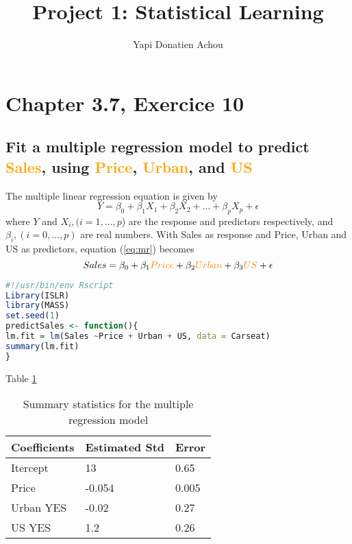 \documentclass[11pt, oneside]{article}   	%
\title{Project 1: Statistical Learning}
\author{Yapi Donatien Achou}
\begin{document}
\maketitle
\section{Chapter 3.7, Exercice 10}
\subsection{Fit a multiple regression model to predict \textcolor{orange}{Sales}, using \textcolor{orange}{Price}, \textcolor{orange}{Urban}, and \textcolor{orange}{US}}
The multiple linear regression equation is given by \cite{gareth}
\begin{equation}\label{eq:mr}
Y = \beta_{0} + \beta_{1}X_{1} + \beta_{2}X_{2}+ \dots + \beta_{p}X_{p} + \epsilon
\end{equation}
where 
$Y$ and $X_{i}, (i = 1,\dots,p$) are the response and predictors respectively, and $\beta_{i}, (i = 0,\dots,p)$ are real numbers.
With Sales as response and Price, Urban and US as predictors, equation (\ref{eq:mr}) becomes
\begin{equation}\label{eq:mr}
Sales = \beta_{0} + \beta_{1}\textcolor{orange}{Price} + \beta_{2}\textcolor{orange}{Urban}+ \beta_{3}\textcolor{orange}{US}+ \epsilon
\end{equation}

\begin{lstlisting}[language=R, caption=R code to predict Sale given Price Urban and US]
#!/usr/bin/env Rscript
Library(ISLR)
library(MASS)
set.seed(1)
predictSales <- function(){
lm.fit = lm(Sales ~Price + Urban + US, data = Carseat)
summary(lm.fit)
}
\end{lstlisting}
Table \ref{table:mr1}
\begin{table}[H]
\centering
\begin{tabular}{lll}
\hline
Coefficients& Estimated Std & Error \\
\hline
Itercept  &  13 &       0.65 \\
Price  &   -0.054 &        0.005 \\
Urban YES  &   -0.02 &        0.27 \\
US YES &   1.2 &       0.26 \\
\hline
\end{tabular}
\label{table:mr1}
\caption{Summary statistics for the multiple regression model }
\end{table}
\end{document}
